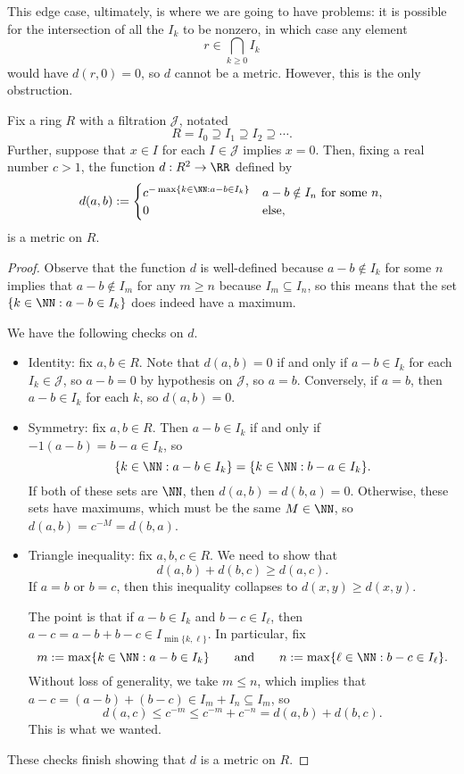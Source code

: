 This edge case, ultimately, is where we are going to have problems: it is possible for the intersection of all the $I_k$ to be nonzero, in which case any element
\[r\in\bigcap_{k\ge0}I_k\]
would have $d(r,0)=0$, so $d$ cannot be a metric. However, this is the only obstruction.
\begin{lemma} \label{lem:krullmetric}
	Fix a ring $R$ with a filtration $\mathcal J$, notated
	\[R=I_0\supseteq I_1\supseteq I_2\supseteq\cdots.\]
	Further, suppose that $x\in I$ for each $I\in\mathcal J$ implies $x=0$. Then, fixing a real number $c>1$, the function $d:R^2\to\RR$ defined by
	\[d(a,b):=\begin{cases}
		c^{-\max\{k\in\NN:a-b\in I_k\}} & a-b\notin I_n\text{ for some }n, \\
		0 & \text{else},
	\end{cases}\]
	is a metric on $R$.
\end{lemma}
\begin{proof}
	Observe that the function $d$ is well-defined because $a-b\notin I_k$ for some $n$ implies that $a-b\notin I_m$ for any $m\ge n$ because $I_m\subseteq I_n$, so this means that the set $\{k\in\NN:a-b\in I_k\}$ does indeed have a maximum.
	
	We have the following checks on $d$.
	\begin{itemize}
		\item Identity: fix $a,b\in R$. Note that $d(a,b)=0$ if and only if $a-b\in I_k$ for each $I_k\in\mathcal J$, so $a-b=0$ by hypothesis on $\mathcal J$, so $a=b$. Conversely, if $a=b$, then $a-b\in I_k$ for each $k$, so $d(a,b)=0$.
		\item Symmetry: fix $a,b\in R$. Then $a-b\in I_k$ if and only if $-1(a-b)=b-a\in I_k$, so
		\[\{k\in\NN:a-b\in I_k\}=\{k\in\NN:b-a\in I_k\}.\]
		If both of these sets are $\NN$, then $d(a,b)=d(b,a)=0$. Otherwise, these sets have maximums, which must be the same $M\in\NN$, so $d(a,b)=c^{-M}=d(b,a)$.
		\item Triangle inequality: fix $a,b,c\in R$. We need to show that
		\[d(a,b)+d(b,c)\ge d(a,c).\]
		If $a=b$ or $b=c$, then this inequality collapses to $d(x,y)\ge d(x,y)$.

		The point is that if $a-b\in I_k$ and $b-c\in I_\ell$, then $a-c=a-b+b-c\in I_{\min\{k,\ell\}}$. In particular, fix
		\[m:=\max\{k\in\NN:a-b\in I_k\}\qquad\text{and}\qquad n:=\max\{\ell\in\NN:b-c\in I_\ell\}.\]
		Without loss of generality, we take $m\le n$, which implies that $a-c=(a-b)+(b-c)\in I_m+I_n\subseteq I_m$, so
		\[d(a,c)\le c^{-m}\le c^{-m}+c^{-n}=d(a,b)+d(b,c).\]
		This is what we wanted.
	\end{itemize}
	These checks finish showing that $d$ is a metric on $R$.
\end{proof}
